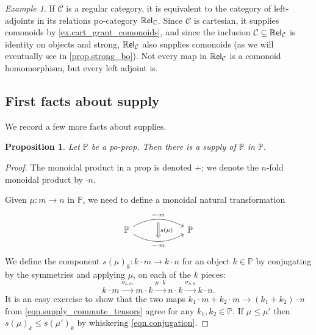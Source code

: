 \documentclass[11pt, oneside, article]{memoir}
\theoremstyle{plain}
\newtheorem{proposition}[theorem]{Proposition}
\theoremstyle{definition}
\theoremstyle{remark}
\newtheorem{example}[theorem]{Example}
\newcommand{\cat}[1]{\mathcal{#1}}%
\newcommand{\ccat}[1]{\mathbb{#1}}%
\newcommand{\Cat}[1]{{\mathsf{#1}}}%
\newcommand{\CCat}[1]{\mathbb{\StrLeft{#1}{1}}\Cat{\StrGobbleLeft{#1}{1}}}%
\newcommand{\pp}{\mathbb{P}}
\newcommand{\To}[1]{\xrightarrow{#1}}
\renewcommand{\ss}{\subseteq}
\newcommand{\rrel}[1]{\CCat{Rel}_{#1}}
\begin{document}
\begin{example}
If $\cat{C}$ is a regular category, it is equivalent to the category of left-adjoints in its relations po-category $\rrel{\ccat{C}}$. Since $\cat{C}$ is cartesian, it supplies comonoids by \cref{ex.cart_grant_comonoids}, and since the inclusion $\cat{C}\ss\rrel{\cat{C}}$ is identity on objects and strong, $\rrel{\cat{C}}$ also supplies comonoids (as we will eventually see in \cref{prop.strong_bo}). Not every map in $\rrel{\cat{C}}$ is a comonoid homomorphism, but every left adjoint is.
\end{example}

\subsection{First facts about supply}

We record a few more facts about supplies.

\begin{proposition}\label{prop.p_supplies_itself}
Let $\pp$ be a po-prop. Then there is a supply of $\pp$ in $\pp$.
\end{proposition}
\begin{proof}
The monoidal product in a prop is denoted $+$; we denote the $n$-fold monoidal product by $\cdot n$.

Given $\mu\colon m\to n$ in $\pp$, we need to define a monoidal natural transformation
\[
\begin{tikzcd}[column sep=60pt]
	\pp\ar[r, bend left, "-\cdot m" name=m]\ar[r, bend right, "-\cdot m"' name=n]&
	\pp
	\ar[from=m, to=n, Rightarrow, shorten <=4pt, shorten >=4pt, "s(\mu)"]
\end{tikzcd}
\]
We define the component $s(\mu)_k\colon k\cdot m\to k\cdot n$ for an object $k\in\pp$ by conjugating by the symmetries and applying $\mu$, on each of the $k$ pieces:
\begin{equation}\label{eqn.conjugation}
	k\cdot m\To{\sigma_{k,m}}
	m\cdot k\To{\mu\cdot k}
	n\cdot k\To{\sigma_{n,k}}
	k\cdot n.
\end{equation}
It is an easy exercise to show that the two maps $k_1\cdot m+k_2\cdot m\to (k_1+k_2)\cdot n$ from \cref{eqn.supply_commute_tensors} agree for any $k_1,k_2\in\pp$. If $\mu\leq\mu'$ then $s(\mu)_k\leq s(\mu')_k$ by whiskering \cref{eqn.conjugation}.
\end{proof}
\end{document}
